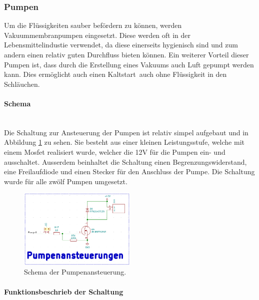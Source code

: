 \subsubsection{Pumpen}
\label{subsubsec:Pumpen}

Um die Flüssigkeiten sauber befördern zu können, werden Vakuummembranpumpen eingesetzt. Diese werden oft in der Lebensmittelindustie verwendet, da diese einerseits hygienisch sind und zum andern einen relativ guten Durchfluss bieten können. Ein weiterer Vorteil dieser Pumpen ist, dass durch die Erstellung eines Vakuums auch Luft gepumpt werden kann. Dies ermöglicht auch einen \flqq Kaltstart\frqq\ auch ohne Flüssigkeit in den Schläuchen.

\paragraph{Schema}\mbox{}\\

Die Schaltung zur Ansteuerung der Pumpen ist relativ simpel aufgebaut und in Abbildung \ref{fig:Schema_Pumpenansteuerung} zu sehen. Sie besteht aus einer kleinen Leistungsstufe, welche mit einem Mosfet realisiert wurde, welcher die 12V für die Pumpen  ein- und ausschaltet. Ausserdem beinhaltet die Schaltung einen Begrenzungswiderstand, eine Freilaufdiode und einen Stecker für den Anschluss der Pumpe. Die Schaltung wurde für alle zwölf Pumpen umgesetzt.

\begin{figure}[h!]
	\centering
	\includegraphics[width=0.5\textwidth]{graphics/Schema_Pumpenansteuerung.png}
	\caption{Schema der Pumpenansteuerung.}
	\label{fig:Schema_Pumpenansteuerung}
\end{figure}

\paragraph{Funktionsbeschrieb der Schaltung}\mbox{}\\

